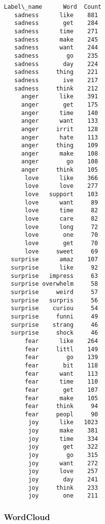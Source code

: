 \documentclass[8pt]{extarticle}
\begin{document}
    \begin{Verbatim}[commandchars=\\\{\}]
Label\_name      Word  Count
   sadness      like    881
   sadness       get    284
   sadness      time    271
   sadness      make    245
   sadness      want    244
   sadness        go    235
   sadness       day    224
   sadness     thing    221
   sadness       ive    217
   sadness     think    212
     anger      like    391
     anger       get    175
     anger      time    140
     anger      want    133
     anger     irrit    128
     anger      hate    113
     anger     thing    109
     anger      make    108
     anger        go    108
     anger     think    105
      love      like    366
      love      love    277
      love   support    103
      love      want     89
      love      time     82
      love      care     82
      love      long     72
      love       one     70
      love       get     70
      love     sweet     69
  surprise      amaz    107
  surprise      like     92
  surprise   impress     63
  surprise overwhelm     58
  surprise     weird     57
  surprise   surpris     56
  surprise    curiou     54
  surprise     funni     49
  surprise    strang     46
  surprise     shock     46
      fear      like    264
      fear     littl    149
      fear        go    139
      fear       bit    118
      fear      want    113
      fear      time    110
      fear       get    107
      fear      make    105
      fear     think     94
      fear     peopl     90
       joy      like   1023
       joy      make    381
       joy      time    334
       joy       get    322
       joy        go    315
       joy      want    272
       joy      love    257
       joy       day    241
       joy     think    233
       joy       one    211
    \end{Verbatim}

    \subsubsection{WordCloud}\label{wordcloud}
\end{document}
